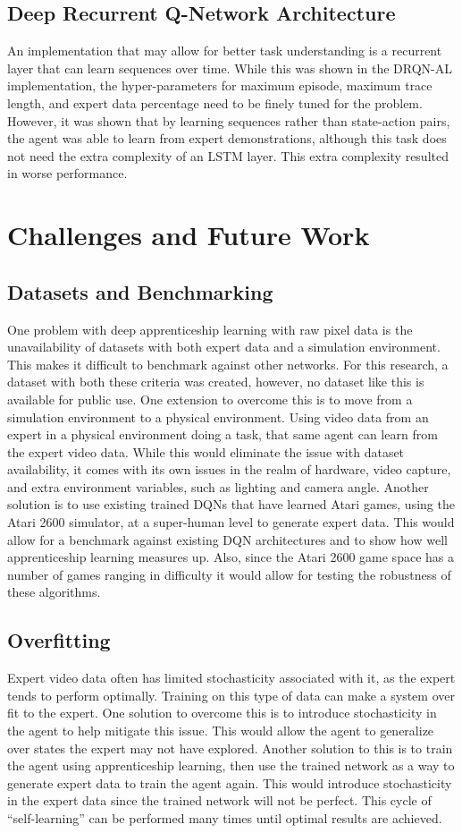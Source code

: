 \documentclass[12pt,american]{report}
\begin{document}
\subsection{Deep Recurrent Q-Network Architecture}
An implementation that may allow for better task understanding is a recurrent layer that can learn sequences over time.  While this was shown in the DRQN-AL implementation, the hyper-parameters for maximum episode, maximum trace length, and expert data percentage need to be finely tuned for the problem.  However, it was shown that by learning sequences rather than state-action pairs, the agent was able to learn from expert demonstrations, although this task does not need the extra complexity of an LSTM layer.  This extra complexity resulted in worse performance.

\section{Challenges and Future Work}
\subsection{Datasets and Benchmarking}
One problem with deep apprenticeship learning with raw pixel data is the unavailability of datasets with both expert data and a simulation environment. This makes it difficult to benchmark against other networks.  For this research, a dataset with both these criteria was created, however, no dataset like this is available for public use.  One extension to overcome this is to move from a simulation environment to a physical environment.  Using video data from an expert in a physical environment doing a task, that same agent can learn from the expert video data.  While this would eliminate the issue with dataset availability, it comes with its own issues in the realm of hardware, video capture, and extra environment variables, such as lighting and camera angle.  Another solution is to use existing trained DQNs that have learned Atari games, using the Atari 2600 simulator, at a super-human level to generate expert data. This would allow for a benchmark against existing DQN architectures and to show how well apprenticeship learning measures up.  Also, since the Atari 2600 game space has a number of games ranging in difficulty it would allow for testing the robustness of these algorithms.
\subsection{Overfitting}
Expert video data often has limited stochasticity associated with it, as the expert tends to perform optimally.  Training on this type of data can make a system over fit to the expert. One solution to overcome this is to introduce stochasticity in the agent to help mitigate this issue.  This would allow the agent to generalize over states the expert may not have explored. Another solution to this is to train the agent using apprenticeship learning, then use the trained network as a way to generate expert data to train the agent again.  This would introduce stochasticity in the expert data since the trained network will not be perfect.  This cycle of ``self-learning'' can be performed many times until optimal results are achieved.
\end{document}
